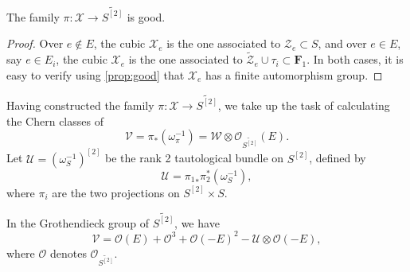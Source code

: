\documentclass[reqno]{amsart}
\renewcommand{\to}{{\longrightarrow}}
\numberwithin{equation}{section}
\renewcommand{\O}{\mathcal{O}}
\newcommand{\F}{\mathbf{F}}
\newcommand{\td}{\widetilde}
\begin{document}
\begin{proposition}
  \label{prop:good4} The family $\pi: \mathcal{X} \to \td{S^{[2]}}$ is
  good.
\end{proposition}
\begin{proof}
  Over $e \not \in E$, the cubic $\mathcal{X}_e$ is the one associated to $\mathcal{Z}_e \subset S$, and over $e \in E$, say $e \in E_i$, the cubic $\mathcal{X}_e$ is the one associated to $\widetilde {\mathcal{Z}}_e \cup \tau_i \subset \F_1$.
  In both cases, it is easy to verify using \autoref{prop:good} that $\mathcal{X}_e$ has a finite automorphism group.
\end{proof}

Having constructed the family $\pi \colon \mathcal{X} \to \widetilde{S^{[2]}}$, we take up the task of calculating the Chern classes of
\[ \mathcal{V} = \pi_* \left(\omega_{\pi}^{-1}\right) = \mathcal{W} \otimes \O_{\widetilde{S^{[2]}}}(E).\]
Let $\mathcal{U} = \left(\omega_S^{-1}\right)^{[2]}$ be the rank 2 tautological bundle on $S^{[2]}$, defined by
\[ \mathcal{U} = {\pi_1}_*\pi_2^* \left(\omega_S^{-1}\right),\]
where $\pi_i$ are the two projections on $S^{[2]} \times S$.
\begin{proposition}\label{prop:v4groth}
  In the Grothendieck group of $\widetilde {S^{[2]}}$, we have
  \[
    \mathcal{V} =  \O(E) + \O^3 + \O(-E)^2 - \mathcal{U} \otimes \O(-E),
  \]
  where $\O$ denotes $\O_{\widetilde{S^[2]}}$.
\end{proposition}
\end{document}

